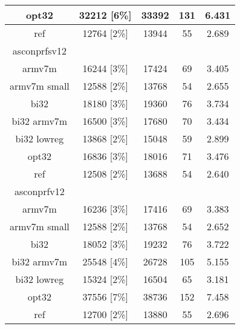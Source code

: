 \begin{table}[h]
\begin{tabular}{|c|c|c|c|c|}
        \hline
        opt32 & 32212 [6\%] & 33392 & 131 & 6.431 \\
        \hline
        ref & 12764 [2\%] & 13944 & 55 & 2.689 \\
        \hline
        asconprfsv12 & & & & \\
        \hline
        armv7m & 16244 [3\%] & 17424 & 69 & 3.405 \\
        \hline
        armv7m small & 12588 [2\%] & 13768 & 54 & 2.655 \\
        \hline
        bi32 & 18180 [3\%] & 19360 & 76 & 3.734 \\ 
        \hline
        bi32 armv7m & 16500 [3\%] & 17680 & 70 & 3.434 \\
        \hline
        bi32 lowreg & 13868 [2\%] & 15048 & 59 & 2.899 \\
        \hline
        opt32 & 16836 [3\%] & 18016 & 71 & 3.476 \\
        \hline
        ref & 12508 [2\%] & 13688 & 54 & 2.640 \\
        \hline
        asconprfv12 & & & & \\
        \hline
        armv7m & 16236 [3\%] & 17416 & 69 & 3.383 \\
        \hline
        armv7m small & 12588 [2\%] & 13768 & 54 & 2.652 \\
        \hline
        bi32 & 18052 [3\%] & 19232 & 76 & 3.722 \\ 
        \hline
        bi32 armv7m & 25548 [4\%] & 26728 & 105 & 5.155 \\
        \hline
        bi32 lowreg & 15324 [2\%] & 16504 & 65 & 3.181 \\
        \hline
        opt32 & 37556 [7\%] & 38736 & 152 & 7.458 \\
        \hline
        ref & 12700 [2\%] & 13880 & 55 & 2.696 \\
        \hline
    \end{tabular}
\end{table}

